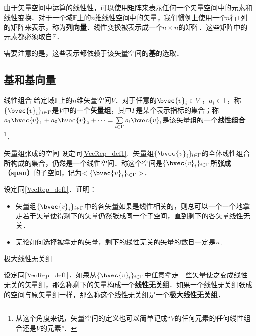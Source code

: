 
由于矢量空间中运算的线性性，可以使用矩阵来表示任何一个矢量空间中的元素和线性变换．对于一个域$\mathbb{F}$上的$n$维线性空间中的矢量，我们惯例上使用一个$n$行$1$列的矩阵来表示，称为\textbf{列向量}．线性变换被表示成一个$n\times n$的矩阵．这些矩阵中的元素都必须取自$\mathbb{F}$．

需要注意的是，这些表示都依赖于该矢量空间的\textbf{基}的选取．

\subsection{基和基向量}

\begin{definition}{线性组合}\label{VecRep_def1}
给定域$\mathbb{F}$上的$n$维矢量空间$V$．对于任意的$\bvec{v}_i\in V$，$a_i\in\mathbb{F}$，称$\{\bvec{v}_i\}_{i\in\Gamma}$是$V$中的一个\textbf{矢量组}，其中$\Gamma$是某个表示指标的集合；称$a_1\bvec{v}_1+a_2\bvec{v}_2+\cdots=\sum\limits_{i\in\Gamma}a_i\bvec{v}_i$是该矢量组的一个\textbf{线性组合}\footnote{从这个角度来说，矢量空间的定义也可以简单记成“$V$的任何元素的任何线性组合还是$V$的元素”．}．
\end{definition}

\begin{definition}{矢量组张成的空间}
设定同\autoref{VecRep_def1}．矢量组$\{\bvec{v}_i\}_{i\in\Gamma}$的全体线性组合所构成的集合，仍然是一个线性空间．称这个空间是$\{\bvec{v}_i\}_{i\in\Gamma}$所\textbf{张成（span）}的子空间，记为$<\{\bvec{v}_i\}_{i\in\Gamma}>$．
\end{definition}

\begin{exercise}{}
设定同\autoref{VecRep_def1}．证明：
\begin{itemize}
\item 矢量组$\{\bvec{v}_i\}_{i\in\Gamma}$中的各矢量如果是线性相关的，则总可以一个一个地拿走若干矢量使得剩下的矢量仍然张成同一个子空间，直到剩下的各矢量线性无关．
\item 无论如何选择被拿走的矢量，剩下的线性无关的矢量的数目一定是$n$．
\end{itemize}
\end{exercise}

\begin{definition}{极大线性无关组}

设定同\autoref{VecRep_def1}．如果从$\{\bvec{v}_i\}_{i\in\Gamma}$中任意拿走一些矢量使之变成线性无关的矢量组，那么称剩下的矢量构成一个\textbf{线性无关组}．如果一个线性无关组张成的空间与原矢量组一样，那么称这个线性无关组是一个\textbf{极大线性无关组}．

\end{definition}

